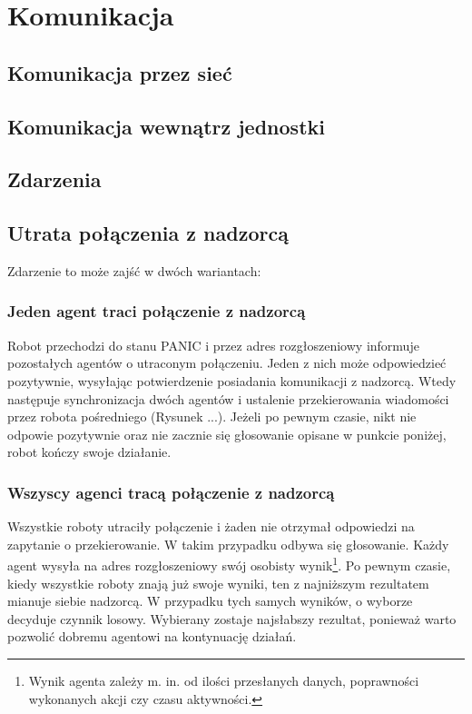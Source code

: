 \chapter{Komunikacja}
\label{ch:komunikacja}

\section{Komunikacja przez sieć}

\section{Komunikacja wewnątrz jednostki}

\section{Zdarzenia}

\section{Utrata połączenia z nadzorcą}

Zdarzenie to może zajść w dwóch wariantach:

\subsection{Jeden agent traci połączenie z nadzorcą}

Robot przechodzi do stanu PANIC i przez adres rozgłoszeniowy informuje pozostałych agentów o utraconym połączeniu. Jeden z nich może odpowiedzieć pozytywnie, wysyłając potwierdzenie posiadania komunikacji z nadzorcą. Wtedy następuje synchronizacja dwóch agentów i ustalenie przekierowania wiadomości przez robota pośredniego (Rysunek ...). Jeżeli po pewnym czasie, nikt nie odpowie pozytywnie oraz nie zacznie się głosowanie opisane w punkcie poniżej, robot kończy swoje działanie.


\subsection{Wszyscy agenci tracą połączenie z nadzorcą}

Wszystkie roboty utraciły połączenie i żaden nie otrzymał odpowiedzi na zapytanie o przekierowanie. W takim przypadku odbywa się głosowanie. Każdy agent wysyła na adres rozgłoszeniowy swój osobisty wynik\footnote{Wynik agenta zależy m. in. od ilości przesłanych danych, poprawności wykonanych akcji czy czasu aktywności.}. Po pewnym czasie, kiedy wszystkie roboty znają już swoje wyniki, ten z najniższym rezultatem mianuje siebie nadzorcą. W przypadku tych samych wyników, o wyborze decyduje czynnik losowy. Wybierany zostaje najsłabszy rezultat, ponieważ warto pozwolić dobremu agentowi na kontynuację działań.

